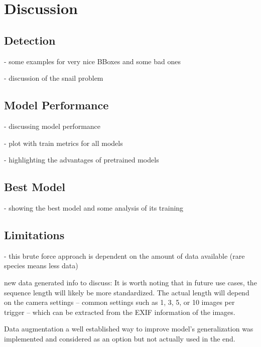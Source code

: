 


\section{Discussion}
\label{discussion}

    \subsection{Detection}
    - some examples for very nice BBoxes and some bad ones

    - discussion of the snail problem

    \subsection{Model Performance}
    - discussing model performance

    - plot with train metrics for all models

    - highlighting the advantages of pretrained models

    \subsection{Best Model}
    - showing the best model and some analysis of its training

    \subsection{Limitations}
    - this brute force approach is dependent on the amount of data available (rare species means less data)


    new data generated info to discuss:
    It is worth noting that in future use cases, the sequence length will likely be more standardized.
    The actual length will depend on the camera settings -- common settings such as 1, 3, 5, or 10 images per trigger -- which can be extracted from the EXIF information of the images.

    Data augmentation a well established way to improve model's generalization \autocite{shortenSurveyImageData2019} was implemented and considered as an option but not actually used in the end.